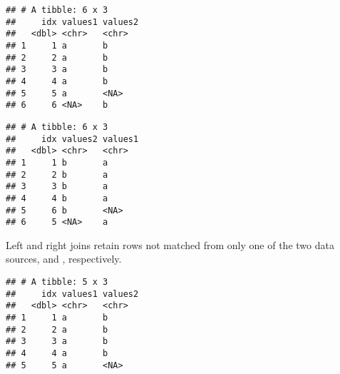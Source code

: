\documentclass[krantz2]{krantz}\usepackage{knitr}
\begin{document}
\begin{knitrout}\footnotesize
{}\color{fgcolor}\begin{kframe}
\begin{alltt}
\hlstd{(}   
\end{alltt}


{\ttfamily\noindent\itshape\color{messagecolor}{\#\# Joining with `by = join\_by(idx)`}}\begin{verbatim}
## # A tibble: 6 x 3
##     idx values1 values2
##   <dbl> <chr>   <chr>  
## 1     1 a       b      
## 2     2 a       b      
## 3     3 a       b      
## 4     4 a       b      
## 5     5 a       <NA>   
## 6     6 <NA>    b
\end{verbatim}
\end{kframe}
\end{knitrout}

\begin{knitrout}\footnotesize
{}\color{fgcolor}\begin{kframe}
\begin{alltt}
\hlstd{(}   
\end{alltt}


{\ttfamily\noindent\itshape\color{messagecolor}{\#\# Joining with `by = join\_by(idx)`}}\begin{verbatim}
## # A tibble: 6 x 3
##     idx values2 values1
##   <dbl> <chr>   <chr>  
## 1     1 b       a      
## 2     2 b       a      
## 3     3 b       a      
## 4     4 b       a      
## 5     6 b       <NA>   
## 6     5 <NA>    a
\end{verbatim}
\end{kframe}
\end{knitrout}

Left and right joins retain rows not matched from only one of the two data sources,  and , respectively.

\begin{knitrout}\footnotesize
{}\color{fgcolor}\begin{kframe}
\begin{alltt}
\hlstd{(}   
\end{alltt}


{\ttfamily\noindent\itshape\color{messagecolor}{\#\# Joining with `by = join\_by(idx)`}}\begin{verbatim}
## # A tibble: 5 x 3
##     idx values1 values2
##   <dbl> <chr>   <chr>  
## 1     1 a       b      
## 2     2 a       b      
## 3     3 a       b      
## 4     4 a       b      
## 5     5 a       <NA>
\end{verbatim}
\end{kframe}
\end{knitrout}
\end{document}
